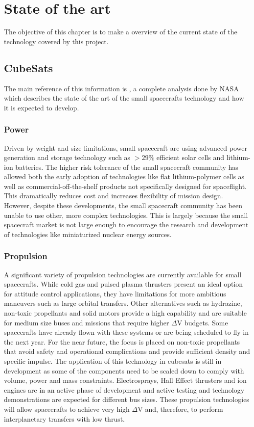 \chapter{State of the art}
The objective of this chapter is to make a overview of the current state of the technology covered by this project. 

\section*{CubeSats}
The main reference of this information is \cite{SOTA}, a complete analysis done by NASA which describes the state of the art of the small spacecrafts technology and how it is expected to develop.
\subsection*{Power}
Driven by weight and size limitations, small spacecraft are using advanced power generation and storage technology such as $>29\% $ efficient solar cells and lithium-ion batteries. The higher risk tolerance of the small spacecraft community has allowed both the early adoption of technologies like flat lithium-polymer cells as well as commercial-off-the-shelf products not specifically designed for spaceflight. This dramatically reduces cost and increases flexibility of mission design. However, despite these developments, the small spacecraft community has been unable to use other, more complex technologies. This is largely because the small spacecraft market is not large enough to encourage the research and development of technologies like miniaturized nuclear energy sources.
\subsection*{Propulsion}
A significant variety of propulsion technologies are currently available for small spacecrafts. While cold gas and pulsed plasma thrusters present an ideal option for attitude control applications, they have limitations for more ambitious maneuvers such as large orbital transfers. Other alternatives such as hydrazine, non-toxic propellants and solid motors provide a high capability and are suitable for medium size buses and missions that require higher $\Delta$V budgets. Some spacecrafts have already flown with these systems or are being scheduled to fly in the next year. For the near future, the focus is placed on non-toxic propellants that avoid safety and operational complications and provide sufficient density and specific impulse. The application of this technology in cubesats is still in development as some of the components need to be scaled down to comply with volume, power and mass constraints.
Electrosprays, Hall Effect thrusters and ion engines are in an active phase of development and active testing and technology demonstrations are expected for different bus sizes. These propulsion technologies will allow spacecrafts to achieve very high $\Delta$V and, therefore, to perform interplanetary transfers with low thrust.
